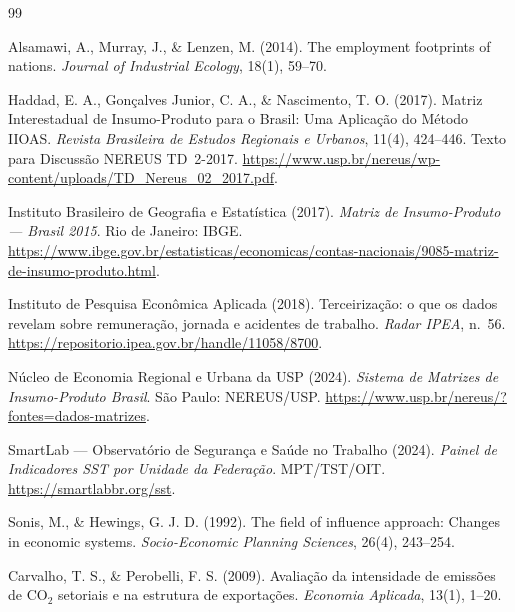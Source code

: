 \documentclass[12pt, a4paper]{article}
\begin{document}

\begin{thebibliography}{99}

Alsamawi, A., Murray, J., \& Lenzen, M. (2014).
The employment footprints of nations.
\textit{Journal of Industrial Ecology}, 18(1), 59--70.

Haddad, E. A., Gonçalves Junior, C. A., \& Nascimento, T. O. (2017).
Matriz Interestadual de Insumo-Produto para o Brasil: Uma Aplicação do Método IIOAS.
\textit{Revista Brasileira de Estudos Regionais e Urbanos}, 11(4), 424--446.
Texto para Discussão NEREUS TD~2-2017.
\url{https://www.usp.br/nereus/wp-content/uploads/TD_Nereus_02_2017.pdf}.

Instituto Brasileiro de Geografia e Estatística (2017).
\textit{Matriz de Insumo-Produto --- Brasil 2015}.
Rio de Janeiro: IBGE.
\url{https://www.ibge.gov.br/estatisticas/economicas/contas-nacionais/9085-matriz-de-insumo-produto.html}.

Instituto de Pesquisa Econômica Aplicada (2018).
Terceirização: o que os dados revelam sobre remuneração, jornada e acidentes de trabalho.
\textit{Radar IPEA}, n.~56.
\url{https://repositorio.ipea.gov.br/handle/11058/8700}.

Núcleo de Economia Regional e Urbana da USP (2024).
\textit{Sistema de Matrizes de Insumo-Produto Brasil}.
São Paulo: NEREUS/USP.
\url{https://www.usp.br/nereus/?fontes=dados-matrizes}.

SmartLab --- Observatório de Segurança e Saúde no Trabalho (2024).
\textit{Painel de Indicadores SST por Unidade da Federação}.
MPT/TST/OIT.
\url{https://smartlabbr.org/sst}.

Sonis, M., \& Hewings, G. J. D. (1992).
The field of influence approach: Changes in economic systems.
\textit{Socio-Economic Planning Sciences}, 26(4), 243--254.

Carvalho, T. S., \& Perobelli, F. S. (2009).
Avaliação da intensidade de emissões de CO$_2$ setoriais e na estrutura de exportações.
\textit{Economia Aplicada}, 13(1), 1--20.


\end{thebibliography}
\end{document}
